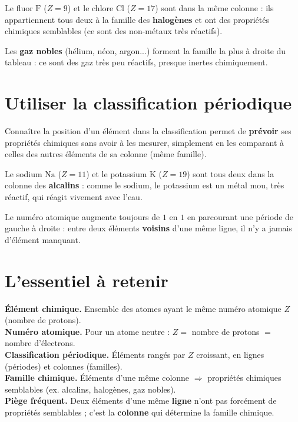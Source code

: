\begin{exemple}
Le fluor $\mathrm{F}$ ($Z=9$) et le chlore $\mathrm{Cl}$ ($Z=17$) sont dans la même colonne
: ils appartiennent tous deux à la famille des \textbf{halogènes} et ont des propriétés
chimiques semblables (ce sont des non-métaux très réactifs).
\end{exemple}

\begin{remarque}
Les \textbf{gaz nobles} (hélium, néon, argon...) forment la famille la plus à droite du
tableau : ce sont des gaz très peu réactifs, presque inertes chimiquement.
\end{remarque}

\section{Utiliser la classification périodique}

\begin{propriete}
Connaître la position d'un élément dans la classification permet de \textbf{prévoir} ses
propriétés chimiques sans avoir à les mesurer, simplement en les comparant à celles des
autres éléments de sa colonne (même famille).
\end{propriete}

\begin{exemple}
Le sodium $\mathrm{Na}$ ($Z=11$) et le potassium $\mathrm{K}$ ($Z=19$) sont tous deux dans
la colonne des \textbf{alcalins} : comme le sodium, le potassium est un métal mou, très
réactif, qui réagit vivement avec l'eau.
\end{exemple}

\begin{remarque}
Le numéro atomique augmente toujours de $1$ en $1$ en parcourant une période de gauche à
droite : entre deux éléments \textbf{voisins} d'une même ligne, il n'y a jamais d'élément
manquant.
\end{remarque}

\section{L'essentiel à retenir}

\begin{synthese}
\textbf{Élément chimique.} Ensemble des atomes ayant le même numéro atomique $Z$ (nombre de
protons).\\[4pt]
\textbf{Numéro atomique.} Pour un atome neutre : $Z=$ nombre de protons $=$ nombre
d'électrons.\\[4pt]
\textbf{Classification périodique.} Éléments rangés par $Z$ croissant, en lignes
(périodes) et colonnes (familles).\\[4pt]
\textbf{Famille chimique.} Éléments d'une même colonne $\Rightarrow$ propriétés chimiques
semblables (ex. alcalins, halogènes, gaz nobles).\\[4pt]
\textbf{Piège fréquent.} Deux éléments d'une même \textbf{ligne} n'ont pas forcément de
propriétés semblables ; c'est la \textbf{colonne} qui détermine la famille chimique.
\end{synthese}

